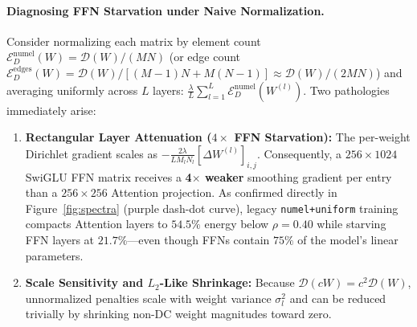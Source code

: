 \documentclass[11pt,a4paper]{article}
\begin{document}
\paragraph{Diagnosing FFN Starvation under Naive Normalization.}
Consider normalizing each matrix by element count $\mathcal{E}_D^{\text{numel}}(W) = \mathcal{D}(W)/(MN)$ (or edge count $\mathcal{E}_D^{\text{edges}}(W) = \mathcal{D}(W)/[(M-1)N + M(N-1)] \approx \mathcal{D}(W)/(2MN)$) and averaging uniformly across $L$ layers: $\frac{\lambda}{L}\sum_{l=1}^L \mathcal{E}_D^{\text{numel}}(W^{(l)})$. Two pathologies immediately arise:
\begin{enumerate}
    \item \textbf{Rectangular Layer Attenuation ($4\times$ FFN Starvation):} The per-weight Dirichlet gradient scales as $-\frac{2\lambda}{L M_l N_l} [\Delta W^{(l)}]_{i,j}$. Consequently, a $256 \times 1024$ SwiGLU FFN matrix receives a \textbf{4$\times$ weaker} smoothing gradient per entry than a $256 \times 256$ Attention projection. As confirmed directly in Figure~\ref{fig:spectra} (purple dash-dot curve), legacy \texttt{numel+uniform} training compacts Attention layers to $54.5\%$ energy below $\rho=0.40$ while starving FFN layers at $21.7\%$---even though FFNs contain $75\%$ of the model's linear parameters.
    \item \textbf{Scale Sensitivity and $L_2$-Like Shrinkage:} Because $\mathcal{D}(cW) = c^2 \mathcal{D}(W)$, unnormalized penalties scale with weight variance $\sigma_l^2$ and can be reduced trivially by shrinking non-DC weight magnitudes toward zero.
\end{enumerate}
\end{document}
